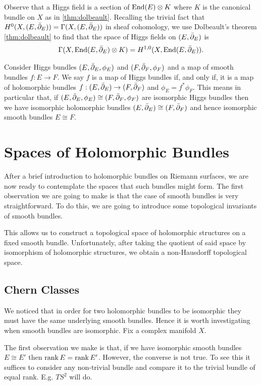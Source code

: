 \documentclass[12pt]{ociamthesis}  %
\begin{document}
Observe that a Higgs field is a section of $\operatorname{End}(E) \otimes K$
where $K$ is the canonical bundle on $X$ as in \ref{thm:dolbeault}.
Recalling the trivial fact that $H^0(X,(E,{\bar{\partial}}_E))=\Gamma(X,(E,{\bar{\partial}}_E))$
in sheaf cohomology, we use Dolbeault's theorem \ref{thm:dolbeault} to
find that the space of Higgs fields on $(E,{\bar{\partial}}_E)$ is
\begin{align*}
  \Gamma(X,\operatorname{End}(E,{\bar{\partial}}_E)\otimes K) = H^{1,0}(X,\operatorname{End}(E,{\bar{\partial}}_E)).
\end{align*}

Consider Higgs bundles $(E,{\bar{\partial}}_E,\phi_E)$ and $(F,{\bar{\partial}}_F,\phi_F)$
and a map of smooth bundles $f:E\to F$. We say $f$ is a map of Higgs
bundles if, and only if, it is a map of holomorphic bundles
$f:(E,{\bar{\partial}}_E)\to (F,{\bar{\partial}}_F)$ and $\phi_E = f^*\phi_F$.
This means in particular that, if
$(E,{\bar{\partial}}_E,\phi_E)\cong(F,{\bar{\partial}}_F,\phi_F)$
are isomorphic Higgs bundles then we have isomorphic holomorphic bundles
$(E,{\bar{\partial}}_E)\cong(F,{\bar{\partial}}_F)$ and hence isomorphic smooth bundles
$E\cong F$.

\section{Spaces of Holomorphic Bundles}

After a brief introduction to holomorphic bundles on Riemann surfaces,
we are now ready to contemplate the spaces that such bundles might
form. The first observation we are going to make is that the case of
smooth bundles is very straightforward. To do this, we are going to
introduce some topological invariants of smooth bundles.

This allows us to construct a topological space of holomorphic structures
on a fixed smooth bundle. Unfortunately, after taking the quotient
of said space by isomorphism of holomorphic structures, we obtain a
non-Hausdorff topological space.

\subsection{Chern Classes}

We noticed that in order for two holomorphic bundles to be isomorphic
they must have the same underlying smooth bundles. Hence it is worth
investigating when smooth bundles are isomorphic. Fix a complex
manifold $X$.

The first observation we make is that, if we have isomorphic smooth
bundles $E\cong E'$ then $\operatorname{rank} E = \operatorname{rank} E'$. However, the converse
is not true. To see this it suffices to consider any non-trivial
bundle and compare it to the trivial bundle of equal rank. E.g.
$TS^2$ will do.
\end{document}
